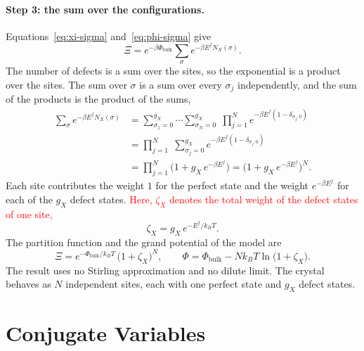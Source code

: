 \documentclass[11pt]{article}      %
\numberwithin{equation}{section}   %
\begin{document}
\paragraph{Step 3: the sum over the configurations.}
Equations~\eqref{eq:xi-sigma} and~\eqref{eq:phi-sigma} give
\begin{equation*}
    \Xi=e^{-\beta\Phi_{\text{bulk}}}\sum_{\sigma}e^{-\beta E^f N_X(\sigma)}.
\end{equation*}
The number of defects is a sum over the sites, so the exponential is a
product over the sites. The sum over $\sigma$ is a sum over every $\sigma_j$
independently, and the sum of the products is the product of the sums,
\begin{align*}
    \sum_{\sigma}e^{-\beta E^f N_X(\sigma)}
    &=\sum_{\sigma_1=0}^{g_X}\cdots\sum_{\sigma_N=0}^{g_X}\;
    \prod_{j=1}^{N}e^{-\beta E^f\left(1-\delta_{\sigma_j,0}\right)}\\
    &=\prod_{j=1}^{N}\;\sum_{\sigma_j=0}^{g_X}
    e^{-\beta E^f\left(1-\delta_{\sigma_j,0}\right)}\\
    &=\prod_{j=1}^{N}\Big(1+g_X\,e^{-\beta E^f}\Big)
    =\Big(1+g_X\,e^{-\beta E^f}\Big)^{N}.
\end{align*}
Each site contributes the weight $1$ for the perfect state and the weight
$e^{-\beta E^f}$ for each of the $g_X$ defect states. \textcolor{red}{Here,
$\zeta_X$ denotes the total weight of the defect states of one site,}
\begin{equation*}
    \zeta_X=g_X\,e^{-E^f/k_BT}.
\end{equation*}
The partition function and the grand potential of the model are
\begin{equation}
    \boxed{\Xi=e^{-\Phi_{\text{bulk}}/k_BT}\,\big(1+\zeta_X\big)^{N},
    \qquad
    \Phi=\Phi_{\text{bulk}}-Nk_BT\ln\big(1+\zeta_X\big).}
    \label{eq:result}
\end{equation}
The result uses no Stirling approximation and no dilute limit. The crystal
behaves as $N$ independent sites, each with one perfect state and $g_X$
defect states.

\section{Conjugate Variables}
\end{document}

